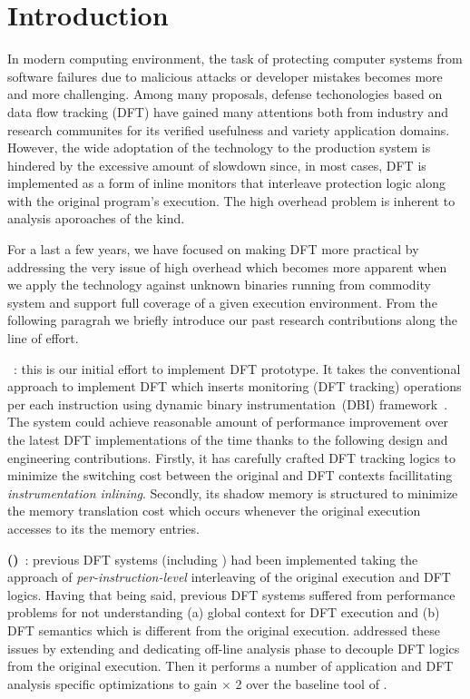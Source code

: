 \section{Introduction} \label{sec:intro}

In modern computing environment, the task of protecting computer systems from
software failures due to malicious attacks or developer mistakes becomes more
and more challenging.
%
Among many proposals, defense techonologies based on data flow tracking (DFT)
have gained many attentions both from industry and research communites for its
verified usefulness and variety application domains. 
%
However, the wide adoptation of the technology to the production system is
hindered by the excessive amount of slowdown since, in most cases, DFT is
implemented as a form of inline monitors that interleave protection logic along
with the original program's execution. The high overhead problem is inherent to
analysis aporoaches of the kind.

For a last a few years, we have focused on making DFT more practical by
addressing the very issue of high overhead which becomes more apparent when we
apply the technology against unknown binaries running from commodity system and
support full coverage of a given execution environment.
%
From the following paragrah we briefly introduce our past research
contributions along the line of effort.

%
%
{\bf \libdft}~\cite{libdft}: this is our initial effort to implement DFT
prototype. It takes the conventional approach to implement DFT which inserts
monitoring (\ie DFT tracking) operations per each instruction using dynamic
binary instrumentation~(DBI) framework~\cite{pin:pldi2005}. The system could
achieve reasonable amount of performance improvement over the latest DFT
implementations of the time thanks to the following design and engineering
contributions. Firstly, it has carefully crafted DFT tracking logics to minimize
the switching cost between the original and DFT contexts facillitating
{\it instrumentation inlining}. Secondly, its shadow memory is structured to
minimize the memory translation cost which occurs whenever the original execution
accesses to its the memory entries.

{\bf \tfafull (\tfa)}~\cite{tfa:ndss2012}: previous DFT systems (including
\libdft) had been implemented taking the approach of {\it per-instruction-level}
interleaving of the original execution and DFT logics. Having that being said,
previous DFT systems suffered from performance problems for not understanding
(a) global context for DFT execution and (b) DFT semantics which is different
from the original execution. \tfa addressed these issues by extending \libdft
and dedicating off-line analysis phase to decouple DFT logics from the original
execution.  Then it performs a number of application and DFT analysis specific
optimizations to gain $\times$ 2 over the baseline tool of \libdft.

